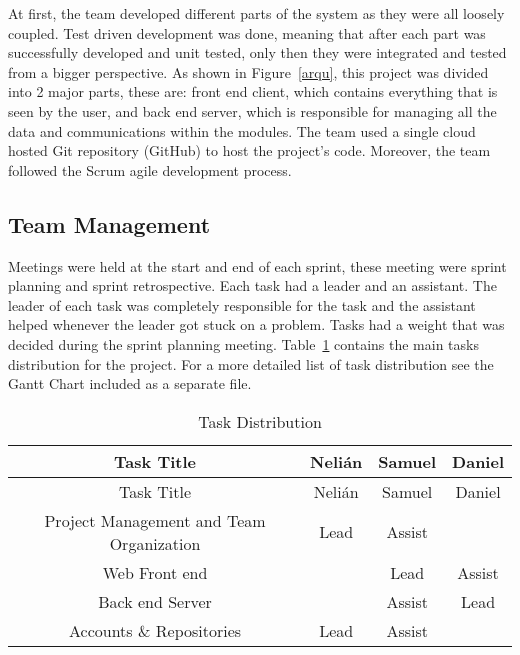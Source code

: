 
At first, the team developed different parts of
the system as they were all loosely coupled. Test driven development was
done, meaning that after each part was successfully developed and unit tested,
only then they were integrated and tested from a bigger perspective. As shown in Figure~\ref{arqu}, this project
was divided into 2 major parts, these are: front end client, which contains everything that is seen by the user, and back end server, which is responsible for managing all the data and communications within the modules. The team used a single cloud hosted Git repository (GitHub) to host the project's
code. Moreover, the
team followed the Scrum agile development process.


\subsection{Team Management}

Meetings were held at the start and end of each sprint, these meeting were
sprint planning and sprint retrospective. Each task had a leader and an
assistant. The leader of each task was completely responsible for the task and
the assistant helped whenever the leader got stuck on a problem. Tasks had a weight that was decided during the sprint planning
meeting. Table~\ref{tasks} contains the main tasks distribution for the project.
For a more detailed list of task distribution see the Gantt Chart included as a
separate file.

\setlength{\extrarowheight}{1.5pt}
  \begin{longtable}{|c|c|c|c|}
 \caption{Task Distribution \label{tasks}} \\
   \hline
  
  \centering Task Title & Nelián & Samuel & Daniel \\
  \hline \hline \endfirsthead
  
     \hline

	\centering Task Title & Nelián & Samuel & Daniel \\  
	\hline \hline \endhead
  
  \endfoot  
  
  Project Management and Team Organization & Lead & Assist & \\ \hline
  Web Front end & & Lead & Assist \\ \hline
  Back end Server & & Assist & Lead \\ \hline
  Accounts \& Repositories & Lead & Assist &\\ \hline
   \end{longtable}
   
